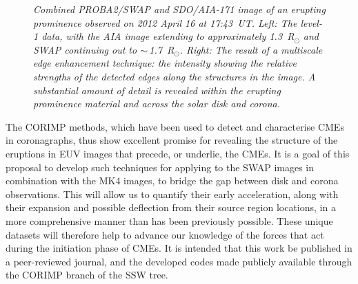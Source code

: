 \documentclass[preprint2]{aastex}
\begin{document}
\begin{figure}[!ht]
\caption{\itshape Combined PROBA2/SWAP and SDO/AIA-171 image of an erupting prominence observed on 2012 April 16 at 17:43~UT. \emph{Left:} The level-1 data, with the AIA image extending to approximately 1.3~R$_\odot$ and SWAP continuing out to $\sim$\,1.7~R$_\odot$. \emph{Right:} The result of a multiscale edge enhancement technique: the intensity showing the relative strengths of the detected edges along the structures in the image. A substantial amount of detail is revealed within the erupting prominence material and across the solar disk and corona.}
\label{smaps}
\end{figure}

The CORIMP methods, which have been used to detect and characterise CMEs in coronagraphs, thus show excellent promise for revealing the structure of the eruptions in EUV images that precede, or underlie, the CMEs. It is a goal of this proposal to develop such techniques for applying to the SWAP images in combination with the MK4 images, to bridge the gap between disk and corona observations. This will allow us to quantify their early acceleration, along with their expansion and possible deflection from their source region locations, in a more comprehensive manner than has been previously possible. These unique datasets will therefore help to advance our knowledge of the forces that act during the initiation phase of CMEs. It is intended that this work be published in a peer-reviewed journal, and the developed codes made publicly available through the CORIMP branch of the SSW tree.
\end{document}
